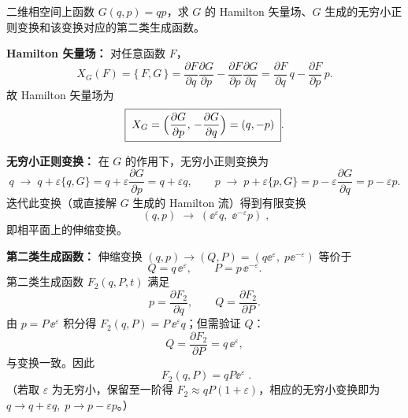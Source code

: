 \begin{question}
二维相空间上函数 \(G(q,p)=qp\)，求 \(G\) 的 Hamilton 矢量场、\(G\) 生成的无穷小正则变换和该变换对应的第二类生成函数。
\begin{solution}
\noindent\textbf{Hamilton 矢量场：} 对任意函数 \(F\)，
\[
X_G(F)=\{\,F,G\,\}
=\frac{\partial F}{\partial q}\frac{\partial G}{\partial p}
-\frac{\partial F}{\partial p}\frac{\partial G}{\partial q}
=\frac{\partial F}{\partial q}\,q-\frac{\partial F}{\partial p}\,p .
\]
故 Hamilton 矢量场为
\[
\boxed{\;X_G=\Bigl(\frac{\partial G}{\partial p},\,-\frac{\partial G}{\partial q}\Bigr)=(q,-p)\;}.
\]

\noindent\textbf{无穷小正则变换：} 在 \(G\) 的作用下，无穷小正则变换为
\[
q\;\longrightarrow\; q+\varepsilon\{q,G\}=q+\varepsilon\frac{\partial G}{\partial p}=q+\varepsilon q,
\qquad
p\;\longrightarrow\; p+\varepsilon\{p,G\}=p-\varepsilon\frac{\partial G}{\partial q}=p-\varepsilon p .
\]
迭代此变换（或直接解 \(G\) 生成的 Hamilton 流）得到有限变换
\[
\boxed{\;(q,p)\;\longrightarrow\;(\ee^{\varepsilon}q,\;\ee^{-\varepsilon}p)\;},
\]
即相平面上的伸缩变换。

\noindent\textbf{第二类生成函数：} 伸缩变换 \((q,p)\to(Q,P)=(q \ee^\varepsilon,\;p \ee^{-\varepsilon})\) 等价于
\[
Q=q\,\ee^{\varepsilon},\qquad P=p\,\ee^{-\varepsilon}.
\]
第二类生成函数 \(F_2(q,P,t)\) 满足
\[
p=\frac{\partial F_2}{\partial q},\qquad Q=\frac{\partial F_2}{\partial P}.
\]
由 \(p=P\,\ee^{\varepsilon}\) 积分得 \(F_2(q,P)=P\,\ee^{\varepsilon}q\)；但需验证 \(Q\)：
\[
Q=\frac{\partial F_2}{\partial P}=q\,\ee^{\varepsilon},
\]
与变换一致。因此
\[
\boxed{\;F_2(q,P)=qP \ee^{\varepsilon}\;}.
\]
（若取 \(\varepsilon\) 为无穷小，保留至一阶得 \(F_2\approx qP(1+\varepsilon)\)，相应的无穷小变换即为 \(q\to q+\varepsilon q,\;p\to p-\varepsilon p\)。）
\end{solution}
\end{question}

